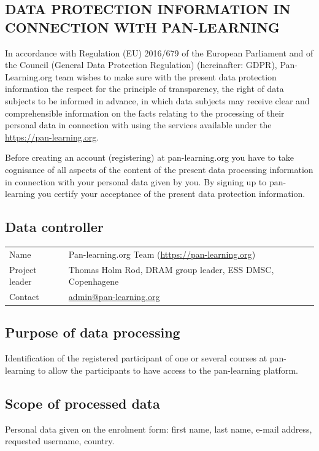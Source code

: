 \documentclass[11pt]{article}
\begin{document}
\begin{center}
    \section*{DATA PROTECTION INFORMATION IN CONNECTION WITH PAN-LEARNING}
\end{center}

In accordance with Regulation (EU) 2016/679 of the European Parliament and of the Council (General Data Protection Regulation) (hereinafter: GDPR), Pan-Learning.org team wishes to make sure with the present data protection information the respect for the principle of transparency, the right of data subjects to be informed in advance, in which data subjects may receive clear and comprehensible information on the facts relating to the processing of their personal data in connection with using the services available under the \url{https://pan-learning.org}.

Before creating an account (registering) at pan-learning.org you have to take cognisance of all aspects of the content of the present data processing information in connection with your personal data given by you. By signing up to pan-learning you certify your acceptance of the present data protection information. 

\subsection{Data controller}
\begin{tabularx}{\textwidth}{@{} X l}
    Name    &  Pan-learning.org Team (\url{https://pan-learning.org})  \\
    Project leader  & Thomas Holm Rod, DRAM group leader, ESS DMSC, Copenhagene \\
    Contact & \href{mailto:admin@pan-learning.org}{admin@pan-learning.org} \\
\end{tabularx}

\subsection{Purpose of data processing}	
Identification of the registered participant of one or several courses at pan-learning to allow the participants to have access to the pan-learning platform. 

\subsection{Scope of processed data}
Personal data given on the enrolment form: first name, last name, e-mail address, requested username, country. 
\end{document}
